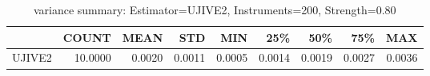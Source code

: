 \begin{table}[ht]
\centering
\caption{variance summary: Estimator=UJIVE2, Instruments=200, Strength=0.80}
\begin{tabular}{lrrrrrrrr}
\toprule
 & COUNT & MEAN & STD & MIN & 25\% & 50\% & 75\% & MAX \\
\midrule
UJIVE2 & 10.0000 & 0.0020 & 0.0011 & 0.0005 & 0.0014 & 0.0019 & 0.0027 & 0.0036 \\
\bottomrule
\end{tabular}
\end{table}
